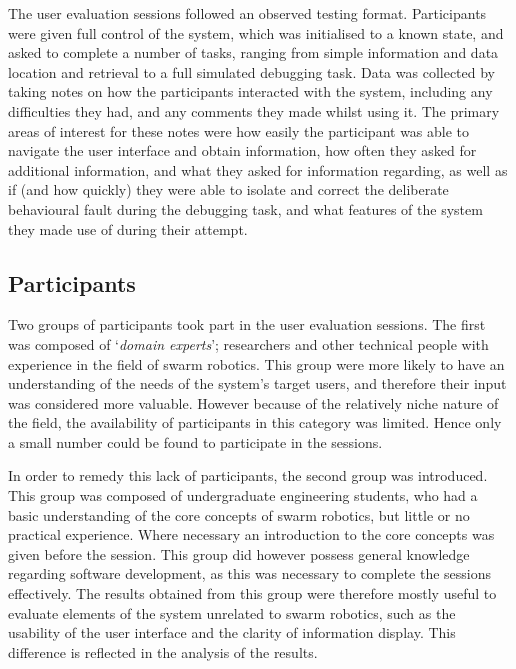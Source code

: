 The user evaluation sessions followed an observed testing format. Participants were given full control of the system, which was initialised to a known state, and asked to complete a number of tasks, ranging from simple information and data location and retrieval to a full simulated debugging task. Data was collected by taking notes on how the participants interacted with the system, including any difficulties they had, and any comments they made whilst using it. The primary areas of interest for these notes were how easily the participant was able to navigate the user interface and obtain information, how often they asked for additional information, and what they asked for information regarding, as well as if (and how quickly) they were able to isolate and correct the deliberate behavioural fault during the debugging task, and what features of the system they made use of during their attempt.

\subsection{Participants}
Two groups of participants took part in the user evaluation sessions. The first was composed of `\textit{domain experts}'; researchers and other technical people with experience in the field of swarm robotics. This group were more likely to have an understanding of the needs of the system's target users, and therefore their input was considered more valuable. However because of the relatively niche nature of the field, the availability of participants in this category was limited. Hence only a small number could be found to participate in the sessions.

In order to remedy this lack of participants, the second group was introduced. This group was composed of undergraduate engineering students, who had a basic understanding of the core concepts of swarm robotics, but little or no practical experience. Where necessary an introduction to the core concepts was given before the session. This group did however possess general knowledge regarding software development, as this was necessary to complete the sessions effectively. The results obtained from this group were therefore mostly useful to evaluate elements of the system unrelated to swarm robotics, such as the usability of the user interface and the clarity of information display. This difference is reflected in the analysis of the results.

